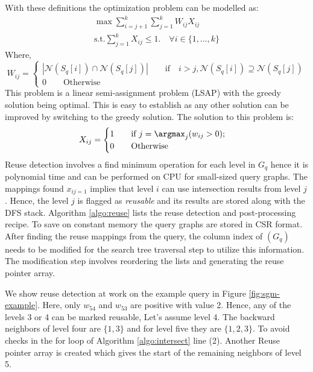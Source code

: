 {With these definitions the optimization problem can be modelled as:
\begin{align}
    \max \sum_{i=j+1}^{k}\sum_{j=1}^{k} W_{ij} X_{ij} \\
    \text{s.t.}
    \sum_{j=1}^k X_{ij} \leq 1. \quad \forall i \in \{1, \dots, k\}
\end{align}
Where, $$
    W_{ij} = \begin{cases}
        |\mathcal{N}(S_q[i]) \cap \mathcal{N}(S_q[j])| \qquad \text{if} \quad i>j, \mathcal{N}(S_q[i]) \supseteq \mathcal{N}(S_q[j]) \\
        0   \qquad \text{Otherwise}
    \end{cases}
$$
This problem is a linear semi-assignment problem (LSAP) with the greedy solution being optimal.
This is easy to establish as any other solution can be improved by switching to the greedy solution.
The solution to this problem is:
$$
    X_{ij}=\begin{cases}
        1   \qquad \text{if } j=\argmax_j(w_{ij}>0); \\
        0   \qquad \text{Otherwise}
    \end{cases}
$$
Reuse detection involves a find minimum operation for each level in $G_q$ hence it is polynomial time and can be performed on CPU for small-sized query graphs.
The mappings found $x_{ij = 1}$ implies that level $i$ can use intersection results from level $j$.
Hence, the level $j$ is flagged as \textit{reusable} and its results are stored along with the DFS stack.
Algorithm \ref{algo:reuse} lists the reuse detection and post-processing recipe.
To save on constant memory the query graphs are stored in CSR format.
After finding the reuse mappings from the query, the column index of $(G_q)$ needs to be modified for the search tree traversal step to utilize this information.
The modification step involves reordering the lists and generating the reuse pointer array.

We show reuse detection at work on the example query in Figure \ref{fig:sgm-example}.
Here, only $w_{54}$ and $w_{53}$ are positive with value 2. Hence, any of the levels 3 or 4 can be marked reusable, Let's assume level 4.
The backward neighbors of level four are $\{1,3\}$ and for level five they are $\{1,2,3\}$. To avoid checks in the for loop of Algorithm \ref{algo:intersect} line (2).
Another Reuse pointer array is created which gives the start of the remaining neighbors of level 5.

}

